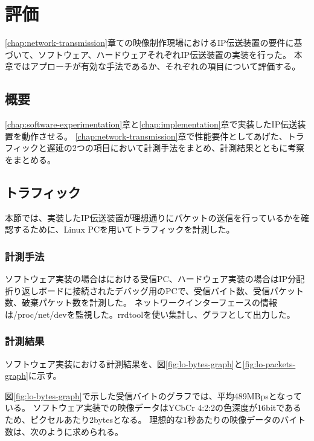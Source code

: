 \chapter{評価}
\label{chap:evaluation}

\ref{chap:network-transmission}章ての映像制作現場におけるIP伝送装置の要件に基づいて、ソフトウェア、ハードウェアそれぞれIP伝送装置の実装を行った。
本章ではアプローチが有効な手法であるか、それぞれの項目について評価する。

\section{概要}

\ref{chap:software-experimentation}章と\ref{chap:implementation}章で実装したIP伝送装置を動作させる。
\ref{chap:network-transmission}章で性能要件としてあげた、トラフィックと遅延の2つの項目において計測手法をまとめ、計測結果とともに考察をまとめる。

\section{トラフィック}

本節では、実装したIP伝送装置が理想通りにパケットの送信を行っているかを確認するために、Linux PCを用いてトラフィックを計測した。

\subsection{計測手法}

ソフトウェア実装の場合はにおける受信PC、ハードウェア実装の場合はIP分配折り返しボードに接続されたデバッグ用のPCで、受信バイト数、受信パケット数、破棄パケット数を計測した。
ネットワークインターフェースの情報は/proc/net/devを監視した。rrdtoolを使い集計し、グラフとして出力した。

\subsection{計測結果}

ソフトウェア実装における計測結果を、図\ref{fig:lo-bytes-graph}と\ref{fig:lo-packets-graph}に示す。

図\ref{fig:lo-bytes-graph}で示した受信バイトのグラフでは、平均489MBpsとなっている。
ソフトウェア実装での映像データはYCbCr 4:2:2の色深度が16bitであるため、ピクセルあたり2bytesとなる。%
理想的な1秒あたりの映像データのバイト数は、次のように求められる。

